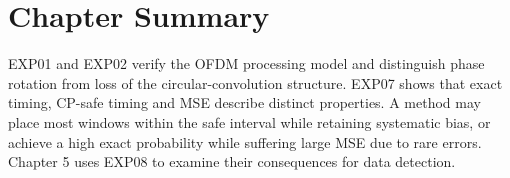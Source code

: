 \section{Chapter Summary}
EXP01 and EXP02 verify the OFDM processing model and distinguish phase rotation from loss of the circular-convolution structure. EXP07 shows that exact timing, CP-safe timing and MSE describe distinct properties. A method may place most windows within the safe interval while retaining systematic bias, or achieve a high exact probability while suffering large MSE due to rare errors. Chapter 5 uses EXP08 to examine their consequences for data detection.
